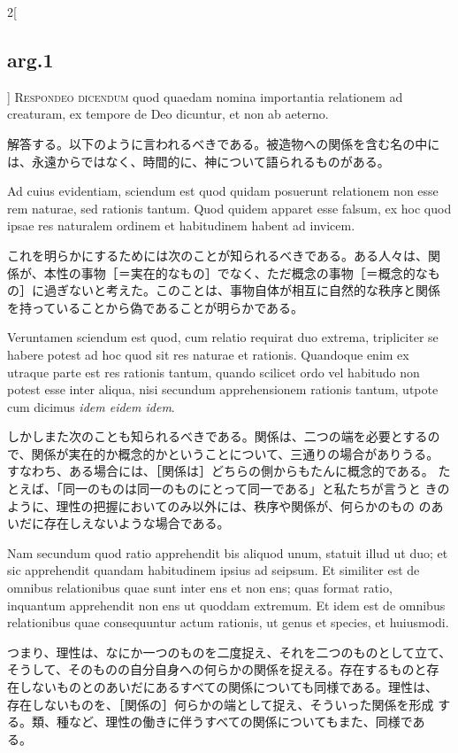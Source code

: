 \documentclass[paper=a4paper,fontsize=10pt,jafontsize=9pt,titlepage]{jlreq}
\begin{document}
\begin{paracol}{2}[\subsection{arg.1}]
{\scshape Respondeo dicendum} quod quaedam nomina importantia
relationem ad creaturam, ex tempore de Deo dicuntur, et non ab
aeterno.

\switchcolumn

解答する。以下のように言われるべきである。被造物への関係を含む名の中に
は、永遠からではなく、時間的に、神について語られるものがある。

\switchcolumn*

Ad cuius evidentiam, sciendum est quod quidam posuerunt relationem non
esse rem naturae, sed rationis tantum. Quod quidem apparet esse
falsum, ex hoc quod ipsae res naturalem ordinem et habitudinem habent
ad invicem.

\switchcolumn

これを明らかにするためには次のことが知られるべきである。ある人々は、関
係が、本性の事物［＝実在的なもの］でなく、ただ概念の事物［＝概念的なも
の］に過ぎないと考えた。このことは、事物自体が相互に自然的な秩序と関係
を持っていることから偽であることが明らかである。

\switchcolumn*

Veruntamen sciendum est quod, cum relatio requirat duo extrema,
tripliciter se habere potest ad hoc quod sit res naturae et
rationis. Quandoque enim ex utraque parte est res rationis tantum,
quando scilicet ordo vel habitudo non potest esse inter aliqua, nisi
secundum apprehensionem rationis tantum, utpote cum dicimus {\itshape
idem eidem idem}.

\switchcolumn

しかしまた次のことも知られるべきである。関係は、二つの端を必要とするの
で、関係が実在的か概念的かということについて、三通りの場合がありうる。
すなわち、ある場合には、［関係は］どちらの側からもたんに概念的である。
たとえば、「同一のものは同一のものにとって同一である」と私たちが言うと
きのように、理性の把握においてのみ以外には、秩序や関係が、何らかのもの
のあいだに存在しえないような場合である。

\switchcolumn*

Nam secundum quod ratio apprehendit bis aliquod unum, statuit illud ut
duo; et sic apprehendit quandam habitudinem ipsius ad seipsum. Et
similiter est de omnibus relationibus quae sunt inter ens et non ens;
quas format ratio, inquantum apprehendit non ens ut quoddam
extremum. Et idem est de omnibus relationibus quae consequuntur actum
rationis, ut genus et species, et huiusmodi.

\switchcolumn

つまり、理性は、なにか一つのものを二度捉え、それを二つのものとして立て、
そうして、そのものの自分自身への何らかの関係を捉える。存在するものと存
在しないものとのあいだにあるすべての関係についても同様である。理性は、
存在しないものを、［関係の］何らかの端として捉え、そういった関係を形成
する。類、種など、理性の働きに伴うすべての関係についてもまた、同様であ
る。


\end{paracol}
\end{document}
